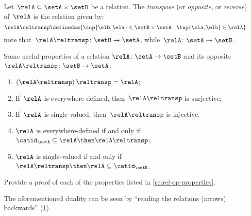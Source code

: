 \begin{definition}
  \label{def:relation-transpose}
  Let~$\relA\subseteq \setA\times \setB$ be a relation. The \emph{transpose} (or \emph{opposite}, or \emph{reverse}) of~$\relA$ is the relation given by:
  \begin{equation*}
    \relA\reltransp \definedas \{\tup{\elb,\ela}\in \setB\times \setA \mid \tup{\ela,\elb}\in \relA \}.
  \end{equation*}
  note that~$\relA\reltransp\colon \setB\to \setA$, while~$\relA\colon \setA\to \setB$.
\end{definition}
\begin{remark}\label{re:rel-op-properties}
  Some useful properties of a relation $\relA\colon \setA\to \setB$  and its opposite $\relA\reltransp\colon \setB\to \setA$:  \begin{enumerate}
    \item $\left(\relA\reltransp\right)\reltransp = \relA $;
    \item If~$\relA$ is everywhere-defined, then~$\relA\reltransp$ is surjective;
    \item If~$\relA$ is single-valued, then~$\relA\reltransp$ is injective.
    \item $\relA$ is everywhere-defined if and only if~$\catid_\setA\subseteq \relA \then \relA\reltransp$;
    \item $\relA$ is single-valued if and only if~$\relA\reltransp\then \relA\subseteq \catid_\setB$.
  \end{enumerate}
\end{remark}

\begin{gradedexercise}\label{ex:RelProperties}
Provide a proof of each of the properties listed in \cref{re:rel-op-properties}.
\end{gradedexercise}



\begin{remark}
  The aforementioned duality can be seen by ``reading the relations (arrows) backwards'' (\cref{fig:rel_transpose}).
\end{remark}

\begin{figure}[h!]
  \centering
  \caption{}
  \label{fig:rel_transpose}
\end{figure}
